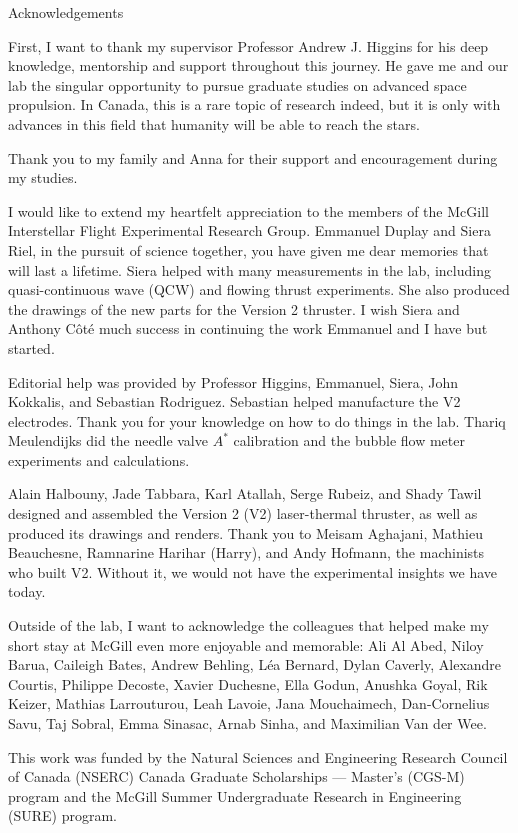 \begin{plainchp}{Acknowledgements}
    
    First, I want to thank my supervisor Professor Andrew J. Higgins for his deep knowledge, mentorship and support throughout this journey. He gave me and our lab the singular opportunity to pursue graduate studies on advanced space propulsion. In Canada, this is a rare topic of research indeed, but it is only with advances in this field that humanity will be able to reach the stars.

    Thank you to my family and Anna for their support and encouragement during my studies.

    I would like to extend my heartfelt appreciation to the members of the McGill Interstellar Flight Experimental Research Group. Emmanuel Duplay and Siera Riel, in the pursuit of science together, you have given me dear memories that will last a lifetime. Siera helped with many measurements in the lab, including quasi-continuous wave (QCW) and flowing thrust experiments. She also produced the drawings of the new parts for the Version 2 thruster. I wish Siera and Anthony Côté much success in continuing the work Emmanuel and I have but started.

    Editorial help was provided by Professor Higgins, Emmanuel, Siera, John Kokkalis, and Sebastian Rodriguez. Sebastian helped manufacture the V2 electrodes. Thank you for your knowledge on how to do things in the lab. Thariq Meulendijks did the needle valve $A^*$ calibration and the bubble flow meter experiments and calculations.

    Alain Halbouny, Jade Tabbara, Karl Atallah, Serge Rubeiz, and Shady Tawil designed and assembled the Version 2 (V2) laser-thermal thruster, as well as produced its drawings and renders. Thank you to Meisam Aghajani, Mathieu Beauchesne, Ramnarine Harihar (Harry), and Andy Hofmann, the machinists who built V2. Without it, we would not have the experimental insights we have today.

    Outside of the lab, I want to acknowledge the colleagues that helped make my short stay at McGill even more enjoyable and memorable: Ali Al Abed, Niloy Barua, Caileigh Bates, Andrew Behling, Léa Bernard, Dylan Caverly, Alexandre Courtis, Philippe Decoste, Xavier Duchesne, Ella Godun, Anushka Goyal, Rik Keizer, Mathias Larrouturou, Leah Lavoie, Jana Mouchaimech, Dan-Cornelius Savu, Taj Sobral, Emma Sinasac, Arnab Sinha, and Maximilian Van der Wee.

    This work was funded by the Natural Sciences and Engineering Research Council of Canada (NSERC) Canada Graduate Scholarships — Master's (CGS-M) program and the McGill Summer Undergraduate Research in Engineering (SURE) program.

\end{plainchp}